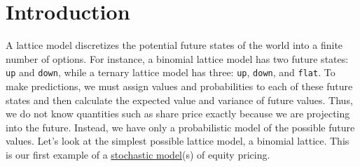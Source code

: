 \documentclass[11pt]{article}
\theoremstyle{definition}
\begin{document}


\section*{Introduction}
A lattice model discretizes the potential future states of the world into a finite number of options. 
For instance, a binomial lattice model has two future states: \texttt{up} and \texttt{down}, while a ternary lattice model has three: \texttt{up}, \texttt{down}, and \texttt{flat}. 
To make predictions, we must assign values and probabilities to each of these future states and then calculate the expected value and variance of future values. 
Thus, we do not know quantities such as share price exactly because we are projecting into the future. Instead, we have only a probabilistic model of the possible future values. 
Let’s look at the simplest possible lattice model, a binomial lattice. This is our first example of a \href{https://en.wikipedia.org/wiki/Stochastic_proces}{stochastic model}(s) of equity pricing.


\clearpage
\printindex
\end{document}
